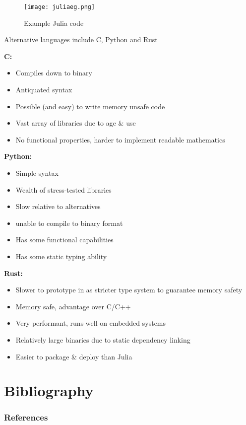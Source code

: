 \documentclass{beamer}
\begin{document}
\begin{frame}
    \begin{figure}[Example Julia code]
        \centering
        \texttt{[image: juliaeg.png]}
        \caption{Example Julia code}%
        \label{fig:name}
    \end{figure}
\end{frame}

\begin{frame}
Alternative languages include C, Python and Rust
\pause

\textbf{ C:}
\begin{itemize}
    \item Compiles down to binary
    \item Antiquated syntax
    \item Possible (and easy) to write memory unsafe code
    \item Vast array of libraries due to age \& use
    \item No functional properties, harder to implement readable mathematics
\end{itemize}
\pause
\textbf{Python:}
\begin{itemize}
    \item Simple syntax
    \item Wealth of stress-tested libraries
    \item Slow relative to alternatives
    \item unable to compile to binary format
    \item Has some functional capabilities
    \item Has some static typing ability
\end{itemize}
\pause
\end{frame}
\begin{frame}
\textbf{Rust:}
\begin{itemize}
    \item Slower to prototype in as stricter type system to guarantee memory safety
    \item Memory safe, advantage over C/C++
    \item Very performant, runs well on embedded systems
    \item Relatively large binaries due to static dependency linking
    \item Easier to package \& deploy than Julia
\end{itemize}
\end{frame}

\section{Bibliography}
\begin{frame}
\frametitle{References}


\end{frame}
\end{document}
